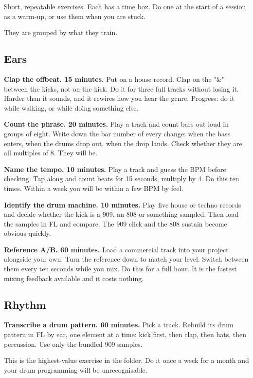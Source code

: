 Short, repeatable exercises. Each has a time box. Do one at the start of a session as a
warm-up, or use them when you are stuck.

They are grouped by what they train.

\subsection{Ears}\label{pr02_exercises-ears}

\textbf{Clap the offbeat. 15 minutes.}
Put on a house record. Clap on the "\&" between the kicks, not on the kick. Do it for three
full tracks without losing it. Harder than it sounds, and it rewires how you hear the genre.
Progress: do it while walking, or while doing something else.

\textbf{Count the phrase. 20 minutes.}
Play a track and count bars out loud in groups of eight. Write down the bar number of every
change: when the bass enters, when the drums drop out, when the drop lands. Check whether
they are all multiples of 8. They will be.

\textbf{Name the tempo. 10 minutes.}
Play a track and guess the BPM before checking. Tap along and count beats for 15 seconds,
multiply by 4. Do this ten times. Within a week you will be within a few BPM by feel.

\textbf{Identify the drum machine. 10 minutes.}
Play five house or techno records and decide whether the kick is a 909, an 808 or something
sampled. Then load the samples in FL and compare. The 909 click and the 808 sustain become
obvious quickly.

\textbf{Reference A/B. 60 minutes.}
Load a commercial track into your project alongside your own. Turn the reference down to
match your level. Switch between them every ten seconds while you mix. Do this for a full
hour. It is the fastest mixing feedback available and it costs nothing.

\subsection{Rhythm}\label{pr02_exercises-rhythm}

\textbf{Transcribe a drum pattern. 60 minutes.}
Pick a track. Rebuild its drum pattern in FL by ear, one element at a time: kick first, then
clap, then hats, then percussion. Use only the bundled 909 samples.

This is the highest-value exercise in the folder. Do it once a week for a month and your
drum programming will be unrecognisable.

